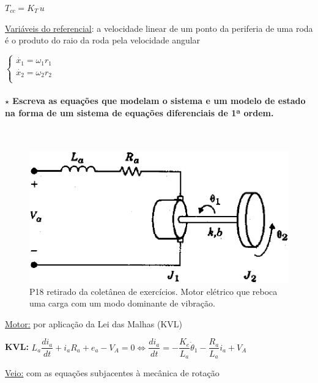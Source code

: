 \noindent \hspace*{1.5 em}\raisebox{0.2 em}{$\drsh$} $T_{cc} = K_T\, u$

\vspace{0.5em}
\noindent\underline{Variáveis do referencial}: a velocidade linear de um ponto da periferia de uma roda é o produto do raio da roda pela velocidade angular

\noindent \hspace*{1.5 em}\raisebox{0.2 em}{$\drsh$} $
                \begin{cases}
                    \dot{x_1} = \omega_1 r_1\\
                    \dot{x_2} = \omega_2 r_2\\
                \end{cases}
$

\clearpage
\paragraph[2.2.3.2 Problema 2]{$\pmb{\star}$ Escreva as equações que modelam o sistema e um modelo de estado na forma de um sistema de
equações diferenciais de 1ª ordem.}\mbox{}\\
\begin{figure}[H]
    \centering
    \includegraphics[width = 0.45\linewidth]{img/1/motor-cc-P18.png}
    \caption{P18 retirado da coletânea de exercícios. Motor elétrico que reboca uma carga com um modo dominante de vibração.}
    \label{fig:motor-cc-P18}
\end{figure}

\noindent \underline{Motor:} por aplicação da Lei das Malhas (KVL)

\noindent \hspace*{1.5 em}\raisebox{0.2 em}{$\drsh$} \textbf{KVL:} $ L_a \dfrac{d i_a}{dt} + i_a R_a + e_a - V_A = 0 \iff \dfrac{d i_a}{dt} = -\dfrac{K_e}{L_a} \dot{\theta}_1 - \dfrac{R_a}{L_a} i_a + V_A$

\vspace{0.5em}
\noindent \underline{Veio:} com as equações subjacentes à mecânica de rotação

